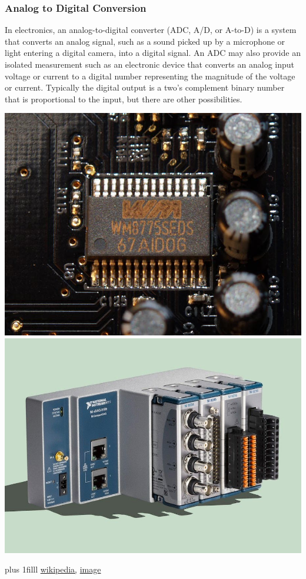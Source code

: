 \documentclass[fleqn]{beamer} %
\newcommand{\sectiontitleIV}{Analog to Digital Conversion}
\newcommand{\btVFill}{\vskip0pt plus 1filll}
\begin{document}
\begin{frame}[label=sectionIV] \scriptsize
\frametitle{\sectiontitleIV}
\bigskip

In electronics, an {\BL analog-to-digital converter} (ADC, A/D, or A-to-D) is a system that converts an analog signal, such as a sound picked up by a microphone or light entering a digital camera, into a digital signal. An ADC may also provide an isolated measurement such as an electronic device that converts an analog input voltage or current to a digital number representing the magnitude of the voltage or current. Typically the digital output is a two's complement binary number that is proportional to the input, but there are other possibilities.

\includegraphics[scale=.15]{WM_WM8775SEDS-AB.jpg} \hspace{5mm} \includegraphics[scale=.15]{ni_cdaq.jpg}

\btVFill
\tiny{\href{https://en.wikipedia.org/wiki/Analog-to-digital_converter}{wikipedia,} \href{https://en.wikipedia.org/wiki/Analog-to-digital_converter\#/media/File:WM_WM8775SEDS-AB.jpg}{image} }	
\end{frame}
\end{document}
